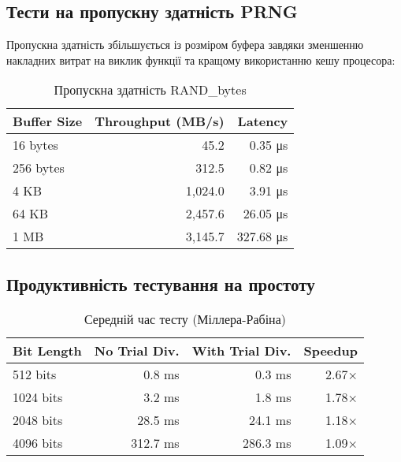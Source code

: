 \subsection{Тести на пропускну здатність PRNG}

Пропускна здатність збільшується із розміром буфера завдяки зменшенню накладних витрат на виклик функції та 
кращому використанню кешу процесора:

\begin{table}[ht]
    \centering
    \begin{tabular}{|l|r|r|}
        \hline
        \textbf{Buffer Size} & \textbf{Throughput (MB/s)} & \textbf{Latency} \\
        \hline
        16 bytes             & 45.2                       & 0.35 μs          \\
        256 bytes            & 312.5                      & 0.82 μs          \\
        4 KB                 & 1,024.0                    & 3.91 μs          \\
        64 KB                & 2,457.6                    & 26.05 μs         \\
        1 MB                 & 3,145.7                    & 327.68 μs        \\
        \hline
    \end{tabular}
    \caption{Пропускна здатність RAND\_bytes}
\end{table}

\subsection{Продуктивність тестування на простоту}

\begin{table}[ht]
    \centering
    \begin{tabular}{|l|r|r|r|}
        \hline
        \textbf{Bit Length} & \textbf{No Trial Div.} & \textbf{With Trial Div.} & \textbf{Speedup} \\
        \hline
        512 bits            & 0.8 ms                 & 0.3 ms                   & 2.67×            \\
        1024 bits           & 3.2 ms                 & 1.8 ms                   & 1.78×            \\
        2048 bits           & 28.5 ms                & 24.1 ms                  & 1.18×            \\
        4096 bits           & 312.7 ms               & 286.3 ms                 & 1.09×            \\
        \hline
    \end{tabular}
    \caption{Середній час тесту (Міллера-Рабіна)}
\end{table}

